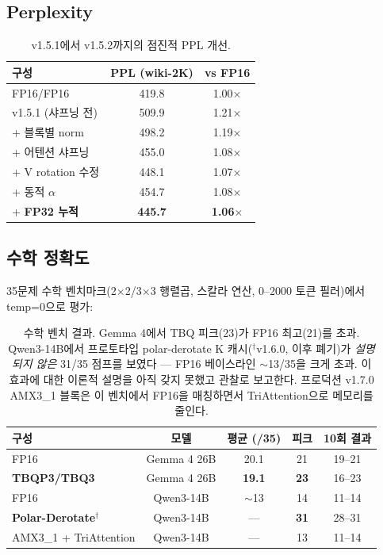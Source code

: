 \documentclass[10pt,twocolumn]{article}
\begin{document}
\subsection{Perplexity}

\begin{table}[h]
\centering
\small
\begin{tabular}{@{}lcc@{}}
\toprule
구성 & PPL (wiki-2K) & vs FP16 \\
\midrule
FP16/FP16 & 419.8 & 1.00$\times$ \\
\midrule
v1.5.1 (샤프닝 전) & 509.9 & 1.21$\times$ \\
+ 블록별 norm & 498.2 & 1.19$\times$ \\
+ 어텐션 샤프닝 & 455.0 & 1.08$\times$ \\
+ V rotation 수정 & 448.1 & 1.07$\times$ \\
+ 동적 $\alpha$ & 454.7 & 1.08$\times$ \\
+ \textbf{FP32 누적} & \textbf{445.7} & \textbf{1.06$\times$} \\
\bottomrule
\end{tabular}
\caption{v1.5.1에서 v1.5.2까지의 점진적 PPL 개선.}
\end{table}

\subsection{수학 정확도}

35문제 수학 벤치마크(2$\times$2/3$\times$3 행렬곱, 스칼라 연산, 0--2000 토큰 필러)에서 temp=0으로 평가:

\begin{table}[h]
\centering
\small
\begin{tabular}{@{}lcccc@{}}
\toprule
구성 & 모델 & 평균 (/35) & 피크 & 10회 결과 \\
\midrule
FP16 & Gemma 4 26B & 20.1 & 21 & 19--21 \\
\textbf{TBQP3/TBQ3} & Gemma 4 26B & \textbf{19.1} & \textbf{23} & 16--23 \\
\midrule
FP16                     & Qwen3-14B & $\sim$13 & 14 & 11--14 \\
\textbf{Polar-Derotate}$^\dagger$ & Qwen3-14B & --- & \textbf{31} & 28--31 \\
AMX3\_1 + TriAttention   & Qwen3-14B & --- & 13 & 11--14 \\
\bottomrule
\end{tabular}
\caption{수학 벤치 결과. Gemma 4에서 TBQ 피크(23)가 FP16 최고(21)를 초과. Qwen3-14B에서 프로토타입 polar-derotate K 캐시($^\dagger$v1.6.0, 이후 폐기)가 \emph{설명되지 않은} 31/35 점프를 보였다 --- FP16 베이스라인 $\sim$13/35을 크게 초과. 이 효과에 대한 이론적 설명을 아직 갖지 못했고 관찰로 보고한다. 프로덕션 v1.7.0 AMX3\_1 블록은 이 벤치에서 FP16을 매칭하면서 TriAttention으로 메모리를 줄인다.}
\label{tab:math}
\end{table}
\end{document}
